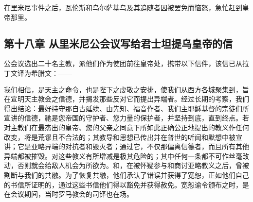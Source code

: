 在里米尼事件之后，瓦伦斯和乌尔萨基乌及其追随者因被罢免而恼怒，急忙赶到皇帝那里。\par


\subsection{第十八章 从里米尼公会议写给君士坦提乌皇帝的信}

公会议选出二十名主教，派他们作为使团前往皇帝处，携带以下信件，该信已从拉丁文译为希腊文：——\par

我们相信，是天主之命令，也是陛下之虔敬之安排，使我们从西方各城聚集到，旨在宣明天主教会之信德，并揭发那些反对它而提出异端者。经过长期的考察，我们得出结论：最好持守那自古延续、由先知、福音作者、我们主耶稣基督的宗徒们所宣讲的信德，祂是您帝国的守护者、您力量的保护者，并坚持到底，直到终点。若对主教们在最杰出的皇帝、您的父亲之同意下所如此正确公正地提出的教义作任何改变，将是荒谬且不合法的；其教导和思想已传出并在普世的听闻和默想中被宣讲；它是亚略异端的对抗者和毁灭者；通过它，不仅那偏离信德者，而且所有其他异端都被摧毁。对这些教义有所增减是极其危险的；其中任何一条都不可作丝毫改动，否则就会给敌人机会为所欲为。和，在被怀疑参与和商讨亚略教义之后，曾被割断与我们的共融。为了恢复共融，他们承认了错误并获得了宽恕，正如他们自己的书信所证明的，通过这些书信他们得以豁免并获得赦免。宽恕谕令颁布之时，是在会议期间，当时罗马教会的司铎也在场。\par

